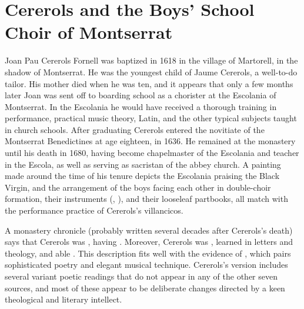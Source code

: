 
\section{Cererols and the Boys' School Choir of Montserrat}

Joan Pau Cererols Fornell was baptized in 1618 in the village of Martorell, in
the shadow of Montserrat.%
    \Autocite{Balanza:CererolsFamily}
He was the youngest child of Jaume Cererols, a well-to-do tailor.
His mother died when he was ten, and it appears that only a few months later
Joan was sent off to boarding school as a chorister at the Escolania of
Montserrat.
In the Escolania he would have received a thorough training in performance,
practical music theory, Latin, and the other typical subjects taught in church
schools.
After graduating Cererols entered the novitiate of the Montserrat Benedictines
at age eighteen, in 1636.
He remained at the monastery until his death in 1680, having become chapelmaster
of the Escolania and teacher in the Escola, as well as serving as sacristan of
the abbey church.
A painting made around the time of his tenure depicts the Escolania praising
the Black Virgin, and the arrangement of the boys facing each other in
double-choir formation, their instruments (, ),
and their looseleaf partbooks, all match with the performance practice of
Cererols's villancicos.%
    \Autocite[34]{Laplana:MontserratMuseu}


A monastery chronicle (probably written several decades after Cererols's death)
says that Cererols was , having .%
    \Autocite[7, note 2]{Estrada:CererolsBio}
Moreover, Cererols was , learned in letters and
theology, and able .%
    \Autocite[7, note 2]{Estrada:CererolsBio}
This description fits well with the evidence of ,
which pairs sophisticated poetry and elegant musical technique.
Cererols's version includes several variant poetic readings that do not appear
in any of the other seven sources, and most of these appear to be deliberate
changes directed by a keen theological and literary intellect.

